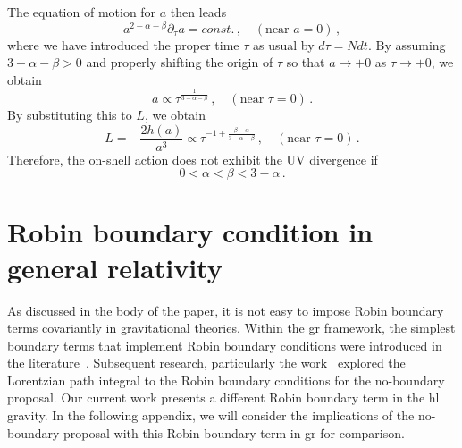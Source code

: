 \documentclass[superscriptaddress,aps,preprintnumbers,nofootinbib]{revtex4-2}
\begin{document}
The equation of motion for $a$ then leads 
\begin{equation}
 a^{2-\alpha-\beta}\partial_{\tau} a = const.\,, \quad (\mbox{near } a=0)\,, 
\end{equation}
where we have introduced the proper time $\tau$ as usual by $d\tau = N dt$. By assuming $3-\alpha-\beta>0$ and properly shifting the origin of $\tau$ so that $a\to +0$ as $\tau\to +0$, we obtain
\begin{equation}
 a \propto \tau^{\frac{1}{3-\alpha-\beta}}\,, \quad (\mbox{near } \tau=0)\,.
\end{equation}
By substituting this to $L$, we obtain
\begin{equation}
 L = -\frac{2h(a)}{a^3} \propto \tau^{-1+\frac{\beta-\alpha}{3-\alpha-\beta}}\,, \quad (\mbox{near } \tau=0)\,.
\end{equation}
Therefore, the on-shell action does not exhibit the UV divergence if 
\begin{equation}
 0 < \alpha < \beta < 3-\alpha\,.
\end{equation}



\section{Robin boundary condition in general relativity}
\label{sec:appendix2}



As discussed in the body of the paper, it is not easy to impose Robin boundary terms covariantly in gravitational theories.  Within the \ac{gr} framework, the simplest boundary terms that implement Robin boundary conditions were introduced in the literature~\cite{Krishnan:2017bte}. Subsequent research, particularly the work~\cite{DiTucci:2019bui} explored the Lorentzian path integral to the Robin boundary conditions for the no-boundary proposal.  Our current work presents a different Robin boundary term in the \ac{hl} gravity. In the following appendix, we will consider the implications of the no-boundary proposal with this Robin boundary term in \ac{gr} for comparison. 
\end{document}

